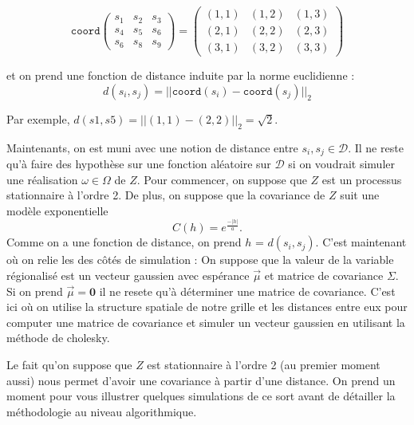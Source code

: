 \documentclass[10pt]{article} %
\begin{document}
$$
    \texttt{coord}
    \begin{pmatrix}
        s_1 & s_2 & s_3 \\
        s_4 & s_5 & s_6 \\
        s_6 & s_8 & s_9
    \end{pmatrix}
    =
    \begin{pmatrix}
        (1, 1) & (1, 2) & (1, 3) \\
        (2, 1) & (2, 2) &(2, 3) \\
        (3, 1) & (3, 2) & (3, 3)
    \end{pmatrix}
$$

et on prend une fonction de distance induite par la norme euclidienne :
$$ d(s_i, s_j) = || \texttt{coord}(s_i) - \texttt{coord}(s_j)||_2 $$

Par exemple, $d(s1, s5) = ||(1, 1) - (2, 2)||_2 = \sqrt{2}$.

Maintenants, on est muni avec une notion de distance entre $s_i, s_j \in \mathcal{D}$. Il ne reste qu'à faire des hypothèse sur une fonction
aléatoire sur $\mathcal{D}$ si on voudrait simuler une réalisation $\omega \in \Omega$ de $Z$. Pour commencer, on suppose que $Z$ est un
processus stationnaire à l'ordre 2. De plus, on suppose que la covariance de $Z$ suit une modèle exponentielle
$$ C(h) = e^{\frac{-|h|}{a}}. $$
Comme on a une fonction de distance, on prend $h$ = $d(s_i, s_j)$. C'est maintenant où on relie les des côtés de simulation : On suppose que
la valeur de la variable régionalisé est un vecteur gaussien avec espérance $\vec \mu$ et matrice de covariance $\Sigma$. Si on prend $\vec\mu = \textbf{0}$ il ne resete
qu'à déterminer une matrice de covariance. C'est ici où on utilise la structure spatiale de notre grille et les distances entre eux pour computer une matrice
de covariance et simuler un vecteur gaussien en utilisant la méthode de cholesky.

Le fait qu'on suppose que $Z$ est stationnaire à l'ordre 2 (au premier moment aussi) nous permet d'avoir une covariance à partir d'une distance. On prend un moment pour vous illustrer
quelques simulations de ce sort avant de détailler la méthodologie au niveau algorithmique.
\end{document}
